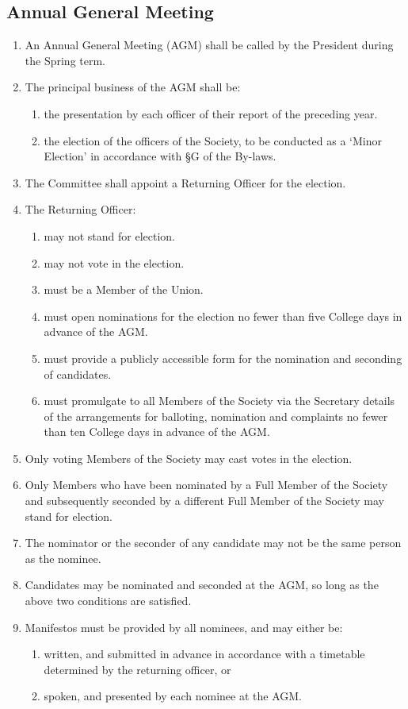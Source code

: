 \documentclass[a4paper]{tufte-handout}
\newcommand{\policyOffset}{12pt}
\newcommand{\policyCspp}[2][\policyOffset]{\marginnote[#1]{\textsc{CSP Policy \S#2}}}
\newcommand{\policyBye}[2][\policyOffset]{\marginnote[#1]{\textsc{Bye-laws \S#2}}}
\begin{document}
\subsection{Annual General Meeting}
\begin{enumerate}[resume]
    \item An Annual General Meeting (AGM) shall be called by the President during the Spring term.
    \item The principal business of the AGM shall be:
        \begin{enumerate}
            \item the presentation by each officer of their report of the preceding year.
            \item \policyCspp{75 \& \S77} the election of the officers of the Society, to be conducted as a `Minor Election' in accordance with {\S}G of the By-laws.
        \end{enumerate}
    \item \policyBye{G2} The Committee shall appoint a Returning Officer for the election.
    \item The Returning Officer:
        \begin{enumerate}
            \item may not stand for election.
            \item may not vote in the election.
            \item must be a Member of the Union.
            \item must open nominations for the election no fewer than five College days in advance of the AGM.
            \item must provide a publicly accessible form for the nomination and seconding of candidates.
            \item must promulgate to all Members of the Society via the Secretary details of the arrangements for balloting, nomination and complaints no fewer than ten College days in advance of the AGM.
        \end{enumerate}
    \item Only voting Members of the Society may cast votes in the election.
    \item Only Members who have been nominated by a Full Member of the Society and subsequently seconded by a different Full Member of the Society may stand for election.
    \item The nominator or the seconder of any candidate may not be the same person as the nominee.
    \item Candidates may be nominated and seconded at the AGM, so long as the above two conditions are satisfied.
    \item \policyBye{G14} Manifestos must be provided by all nominees, and may either be:
        \begin{enumerate}
            \item written, and submitted in advance in accordance with a timetable determined by the returning officer, or
            \item spoken, and presented by each nominee at the AGM.
        \end{enumerate}
\end{enumerate}
\end{document}
